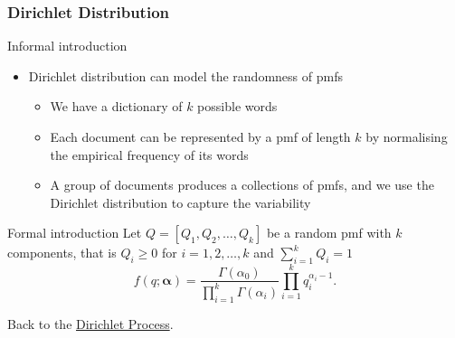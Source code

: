 \appendix
\begin{frame}[label=dirichletsupplemental]
    \frametitle{Dirichlet Distribution}

    \begin{block}{Informal introduction}
        \begin{itemize}
            \item Dirichlet distribution can model the randomness of pmfs
            \begin{itemize}
                \item We have a dictionary of $k$ possible words
                \item Each document can be represented by a pmf of length $k$ by normalising the empirical frequency of its words
                \item A group of documents produces a collections of pmfs, and we use the Dirichlet distribution to capture the variability
            \end{itemize}
        \end{itemize}
    \end{block}

    \begin{block}{Formal introduction}
        Let $Q = [Q_1, Q_2,\ldots,Q_k]$ be a random pmf with $k$ components, that is $Q_i \geq 0$ for $i=1,2,\ldots,k$ and $\sum_{i=1}^k Q_i = 1$
        \[ f(q;\boldsymbol\alpha) = \frac{\Gamma(\alpha_0)}{\prod_{i=1}^k\Gamma(\alpha_i)}\prod_{i=1}^kq_i^{\alpha_i-1}. \]
    \end{block}
Back to the \hyperlink{dirichletprocess}{Dirichlet Process}.
\end{frame}
